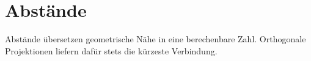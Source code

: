 \section{Abstände}
\label{sec:analytic_geometry_distances}

Abstände übersetzen geometrische Nähe in eine berechenbare Zahl. Orthogonale
Projektionen liefern dafür stets die kürzeste Verbindung.




